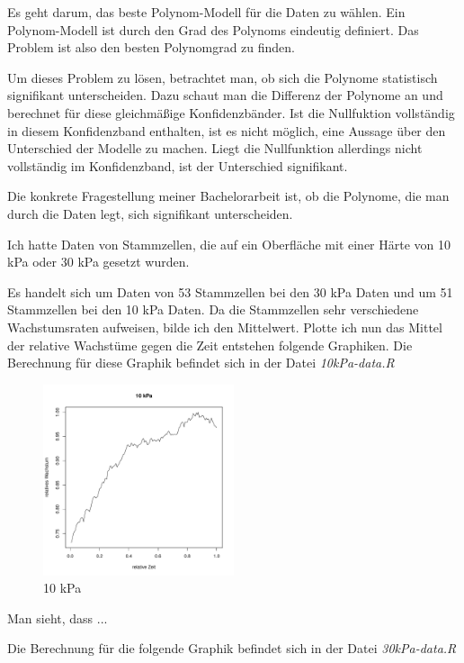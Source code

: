 \documentclass[12pt,a4paper]{article}
\theoremstyle{definition}
\theoremstyle{definition}
\theoremstyle{definition}
\begin{document}
Es geht darum, das beste Polynom-Modell für die Daten zu wählen. Ein Polynom-Modell ist durch den Grad des Polynoms eindeutig definiert. Das Problem ist also den besten Polynomgrad zu finden.

Um dieses Problem zu lösen, betrachtet man, ob sich die Polynome statistisch signifikant unterscheiden. Dazu schaut man die Differenz der Polynome an und berechnet für diese gleichmäßige Konfidenzbänder. Ist die Nullfuktion vollständig in diesem Konfidenzband enthalten, ist es nicht möglich, eine Aussage über den Unterschied der Modelle zu machen. Liegt die Nullfunktion allerdings nicht vollständig im Konfidenzband, ist der Unterschied signifikant.

Die konkrete Fragestellung meiner Bachelorarbeit ist, ob die Polynome, die man durch die Daten legt, sich signifikant unterscheiden.

Ich hatte Daten von Stammzellen, die auf ein Oberfläche mit einer Härte von 10 kPa oder 30 kPa gesetzt wurden. 

Es handelt sich um Daten von 53 Stammzellen bei den 30 kPa Daten und um 51 Stammzellen bei den 10 kPa Daten. Da die Stammzellen sehr verschiedene Wachstumsraten aufweisen, bilde ich den Mittelwert. 
Plotte ich nun das Mittel der relative Wachstüme gegen die Zeit entstehen folgende Graphiken. Die Berechnung für diese Graphik befindet sich in der Datei \textit{10kPa-data.R}

\begin{figure}[H] 
  \centering
     \includegraphics[width=0.5\textwidth]{10kPa-data.pdf}
  \caption{10 kPa}
  \label{10kPa-data}
\end{figure}

Man sieht, dass ...

Die Berechnung für die folgende Graphik befindet sich in der Datei \textit{30kPa-data.R}
\end{document}
